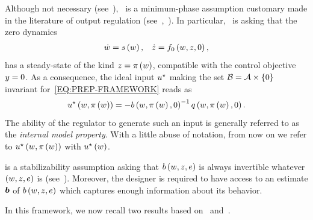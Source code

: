 \begin{remark}
	Although not necessary (see~\cite{byrnes2003limit}),~ is a minimum-phase assumption 
	customary made in the literature of output regulation (see~\cite{isidori2017lectures},~\cite{pavlov2006uniform}).
	In particular,~ is asking that the zero dynamics
	\begin{equation*}
	   \begin{matrix}
		  \dot{w} = s \left( w \right), & \dot{z} = f_0 \left( w, z, 0 \right),
	   \end{matrix}
	\end{equation*}
	has a steady-state of the kind $z = \pi \left( w \right)$, compatible with the control objective $y = 0$.
	As a consequence, the ideal input $u^{\star}$ making the set $\mathcal{B} = \mathcal{A} \times \{0\}$ invariant for~\eqref{EQ:PREP-FRAMEWORK} reads as
	\begin{equation*}
	   u^{\star} \left( w, \pi \left( w \right) \right) = - b \left( w, \pi \left( w \right), 0 \right)^{-1} q \left( w, \pi \left( w \right), 0 \right).
	\end{equation*}
	The ability of the regulator to generate such an input is generally referred to as the \emph{internal model property}.
	With a little abuse of notation, from now on we refer to $ u^{\star} \left( w, \pi \left( w \right) \right)$ with $ u^{\star} \left( w \right)$.
 \end{remark}
 \begin{remark}
	 is a stabilizability assumption asking that $b \left( w, z, e \right)$
	is always invertible whatever $\left( w, z, e \right)$ is (see~\cite{wang2017robust}).
	Moreover, the designer is required to have access to an estimate $\boldsymbol{b}$ of $b \left( w, z, e \right)$
	which captures enough information about its behavior.
 \end{remark}
In this framework, we now recall two results based on~\cite{marconi2007output} and~\cite[Theorem 1]{bin2020approximate}.
